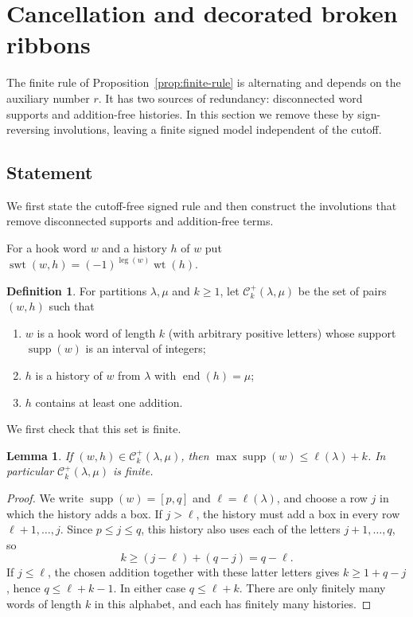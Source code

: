 \documentclass[11pt]{amsart}
\numberwithin{equation}{section}
\newtheorem{lemma}[theorem]{Lemma}
\theoremstyle{definition}
\newtheorem{definition}[theorem]{Definition}
\theoremstyle{remark}
\newcommand{\wt}{\operatorname{wt}}
\newcommand{\swt}{\operatorname{swt}}
\newcommand{\leg}{\operatorname{leg}}
\newcommand{\supp}{\operatorname{supp}}
\newcommand{\enD}{\operatorname{end}}
\newcommand{\cC}{\mathcal C}
\begin{document}
\section{Cancellation and decorated broken ribbons}\label{sec:cancellation}
The finite rule of Proposition~\ref{prop:finite-rule} is alternating and
depends on the auxiliary number $r$. It has two sources of redundancy: disconnected word
supports and addition-free histories. In this section we remove these by sign-reversing
involutions, leaving a finite signed model independent of the cutoff.

\subsection{Statement} We first state the cutoff-free signed rule and then construct the
involutions that remove disconnected supports and addition-free terms.

For a hook word $w$ and a history $h$ of $w$ put
$\swt(w,h)=(-1)^{\leg(w)}\wt(h)$.

\begin{definition}\label{def:Cplus}
For partitions $\lambda,\mu$ and $k\geq1$, let $\cC^+_k(\lambda,\mu)$ be the
set of pairs $(w,h)$ such that
\begin{enumerate}[label=\textup{(\roman*)}]
\item $w$ is a hook word of length $k$ (with arbitrary positive letters)
whose support $\supp(w)$ is an interval of integers;
\item $h$ is a history of $w$ from $\lambda$ with $\enD(h)=\mu$;
\item $h$ contains at least one addition.
\end{enumerate}
\end{definition}

We first check that this set is finite.

\begin{lemma}\label{lem:row-bound}
If $(w,h)\in\cC^+_k(\lambda,\mu)$, then $\max\supp(w)\leq\ell(\lambda)+k$. In
particular $\cC^+_k(\lambda,\mu)$ is finite.
\end{lemma}

\begin{proof}
We write $\supp(w)=[p,q]$ and $\ell=\ell(\lambda)$, and choose a row $j$
in which the history adds a box. If $j>\ell$, the history must add a
box in every row $\ell+1,\ldots,j$. Since $p \leq j \leq q$, this history also uses each of the letters
$j+1,\ldots,q$, so
\[
 k\geq(j-\ell)+(q-j)=q-\ell.
\]
If $j\leq\ell$, the chosen addition together with these latter letters
gives $k\geq1+q-j$, hence $q\leq\ell+k-1$. In either case
$q\leq\ell+k$. There are only finitely many words of length $k$ in
this alphabet, and each has finitely many histories.
\end{proof}
\end{document}
